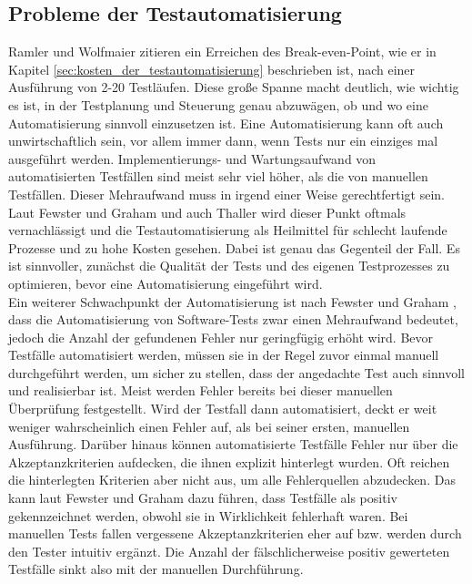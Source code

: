 \subsection{Probleme der Testautomatisierung}
\label{sec:probleme_der_testautomatisierung}
Ramler und Wolfmaier \cite{ramler_economic_2006} zitieren ein Erreichen des Break-even-Point, wie er in Kapitel \ref{sec:kosten_der_testautomatisierung} beschrieben ist, nach einer Ausführung von 2-20 Testläufen. Diese große Spanne macht deutlich, wie wichtig es ist, in der Testplanung und Steuerung genau abzuwägen, ob und wo eine Automatisierung sinnvoll einzusetzen ist. Eine Automatisierung kann oft auch unwirtschaftlich sein, vor allem immer dann, wenn Tests nur ein einziges mal ausgeführt werden. Implementierungs- und Wartungsaufwand von automatisierten Testfällen sind meist sehr viel höher, als die von manuellen Testfällen. Dieser Mehraufwand muss in irgend einer Weise gerechtfertigt sein. Laut Fewster und Graham \cite[vgl. S. 22 ff.]{fewster_software_1999} und auch Thaller \cite[vgl. S.230 ff.]{thaller_software-test_2002} wird dieser Punkt oftmals vernachlässigt und die Testautomatisierung als Heilmittel für schlecht laufende Prozesse und zu hohe Kosten gesehen. Dabei ist genau das Gegenteil der Fall. Es ist sinnvoller, zunächst die Qualität der Tests und des eigenen Testprozesses zu optimieren, bevor eine Automatisierung eingeführt wird.\\ 
Ein weiterer Schwachpunkt der Automatisierung ist nach Fewster und Graham \cite[vgl. S. 22 ff.]{fewster_software_1999}, dass die Automatisierung von Software-Tests zwar einen Mehraufwand bedeutet, jedoch die Anzahl der gefundenen Fehler nur geringfügig erhöht wird.
Bevor Testfälle automatisiert werden, müssen sie in der Regel zuvor einmal manuell durchgeführt werden, um sicher zu stellen, dass der angedachte Test auch sinnvoll und realisierbar ist. Meist werden Fehler bereits bei dieser manuellen Überprüfung festgestellt. Wird der Testfall dann automatisiert, deckt er weit weniger wahrscheinlich einen Fehler auf, als bei seiner ersten, manuellen Ausführung. Darüber hinaus können automatisierte Testfälle Fehler nur über die Akzeptanzkriterien aufdecken, die ihnen explizit hinterlegt wurden. Oft reichen die hinterlegten Kriterien aber nicht aus, um alle Fehlerquellen abzudecken. Das kann laut Fewster und Graham \cite[vgl. S. 23 ff.]{fewster_software_1999} dazu führen, dass Testfälle als positiv gekennzeichnet werden, obwohl sie in Wirklichkeit fehlerhaft waren. Bei manuellen Tests fallen vergessene Akzeptanzkriterien eher auf bzw. werden durch den Tester intuitiv ergänzt. Die Anzahl der fälschlicherweise positiv gewerteten Testfälle sinkt also mit der manuellen Durchführung.\\
